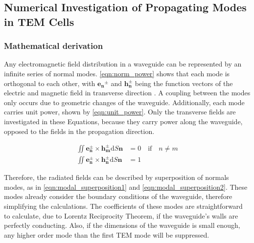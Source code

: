 \subsection{Numerical Investigation of Propagating Modes in TEM Cells}\label{sec:modes_tem_cell}
\subsubsection{Mathematical derivation}



Any electromagnetic field distribution in a waveguide can be represented by an infinite series of normal modes. \autoref{eqn:norm_power} shows that each mode is orthogonal to each other, with $\mathbf{e_n}^\pm$ and $\mathbf{h_n^\pm}$ being the function vectors of the electric and magnetic field in transverse direction \cite{Collin_2015}. A coupling between the modes only occurs due to geometric changes of the waveguide. Additionally, each mode carries unit power, shown by \autoref{eqn:unit_power}. Only the transverse fields are investigated in these Equations, because they carry power along the waveguide, opposed to the fields in the propagation direction.

\begin{align}
    \iint \mathbf{e_n^\pm}\times \mathbf{h_m^\pm}\mathrm{d}S\mathbf{n}&=0 \quad\text{if}\quad n\neq m
    \label{eqn:norm_power}\\
    \iint \mathbf{e_n^\pm}\times \mathbf{h_n^\pm}\mathrm{d}S\mathbf{n}&=1
    \label{eqn:unit_power}
\end{align}

Therefore, the radiated fields can be described by superposition of normals modes, as in \autoref{eqn:modal_superposition1} and \autoref{eqn:modal_superposition2}. These modes already consider the boundary conditions of the waveguide, therefore simplifying the calculations. The coefficients of these modes are straightforward to calculate, due to Lorentz Reciprocity Theorem, if the waveguide's walls are perfectly conducting. Also, if the dimensions of the waveguide is small enough, any higher order mode than the first TEM mode will be suppressed. 

